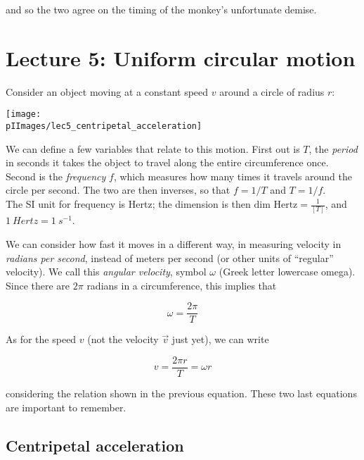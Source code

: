 and so the two agree on the timing of the monkey's unfortunate demise.

\newpage

\section{Lecture 5: Uniform circular motion}

Consider an object moving at a constant speed $v$ around a circle of radius $r$:

\begin{center}
\texttt{[image: \\pIImages/lec5\_centripetal\_acceleration]}
\end{center}

We can define a few variables that relate to this motion. First out is $T$, the \emph{period} in seconds it takes the object to travel along the entire circumference once. Second is the \emph{frequency} $f$, which measures how many times it travels around the circle per second. The two are then inverses, so that $f = 1/T$ and $T = 1/f$.\\
The SI unit for frequency is Hertz; the dimension is then $\text{dim Hertz} = \displaystyle \frac{1}{[T]}$, and $\SI{1}{Hertz} = \SI{1}{s^{-1}}$.

We can consider how fast it moves in a different way, in measuring velocity in \emph{radians per second}, instead of meters per second (or other units of ``regular'' velocity). We call this \emph{angular velocity}, symbol $\omega$ (Greek letter lowercase omega). Since there are $2\pi$ radians in a circumference, this implies that

\begin{equation}
\omega = \frac{2 \pi}{T}
\end{equation}

As for the speed $v$ (not the velocity $\vec{v}$ just yet), we can write

\begin{equation}
v = \frac{2 \pi r}{T} = \omega r
\end{equation}

considering the relation shown in the previous equation. These two last equations are important to remember.

\subsection{Centripetal acceleration}


